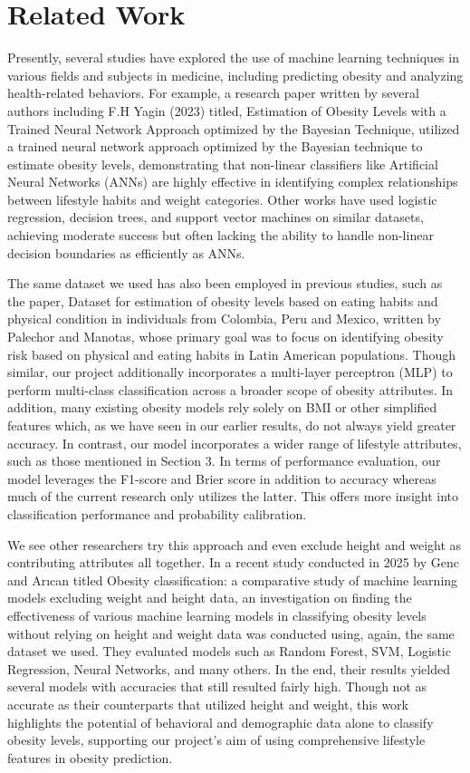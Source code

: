 \documentclass[conference]{IEEEtran}
\begin{document}
\section{Related Work}
Presently, several studies have explored the use of machine learning techniques in various fields and subjects in medicine, including predicting obesity and analyzing health-related behaviors. For example, a research paper written by several authors including F.H Yagin (2023) titled, Estimation of Obesity Levels with a Trained Neural Network Approach optimized by the Bayesian Technique, utilized a trained neural network approach optimized by the Bayesian technique to estimate obesity levels, demonstrating that non-linear classifiers like Artificial Neural Networks (ANNs) are highly effective in identifying complex relationships between lifestyle habits and weight categories. Other works have used logistic regression, decision trees, and support vector machines on similar datasets, achieving moderate success but often lacking the ability to handle non-linear decision boundaries as efficiently as ANNs.

The same dataset we used has also been employed in previous studies, such as the paper, Dataset for estimation of obesity levels based on eating habits and physical condition in individuals from Colombia, Peru and Mexico, written by Palechor and Manotas, whose primary goal was to focus on identifying obesity risk based on physical and eating habits in Latin American populations. Though similar, our project additionally incorporates a multi-layer perceptron (MLP) to perform multi-class classification across a broader scope of obesity attributes. In addition, many existing obesity models rely solely on BMI or other simplified features which, as we have seen in our earlier results, do not always yield greater accuracy. In contrast, our model incorporates a wider range of lifestyle attributes, such as those mentioned in Section 3. In terms of performance evaluation, our model leverages the F1-score and Brier score in addition to accuracy whereas much of the current research only utilizes the latter. This offers more insight into classification performance and probability calibration.

We see other researchers try this approach and even exclude height and weight as contributing attributes all together. In a recent study conducted in 2025 by Genc and Arıcan titled Obesity classification: a comparative study of machine learning models excluding weight and height data, an investigation on finding the effectiveness of various machine learning models in classifying obesity levels without relying on height and weight data was conducted using, again, the same dataset we used. They evaluated models such as Random Forest, SVM, Logistic Regression, Neural Networks, and many others. In the end, their results yielded several models with accuracies that still resulted fairly high. Though not as accurate as their counterparts that utilized height and weight, this work highlights the potential of behavioral and demographic data alone to classify obesity levels, supporting our project’s aim of using comprehensive lifestyle features in obesity prediction. 
\end{document}
